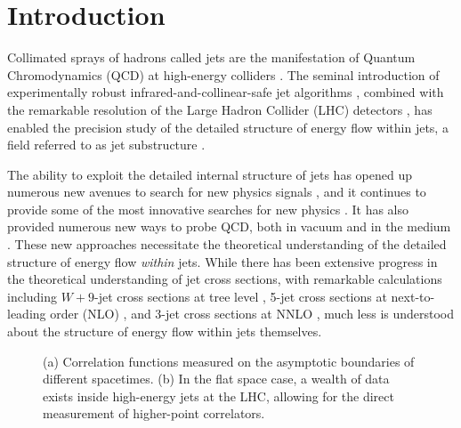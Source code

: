 \documentclass[letterpaper,11pt]{article}
\begin{document}
\section{Introduction}\label{sec:intro}


Collimated sprays of hadrons called jets are the manifestation of Quantum Chromodynamics (QCD) at high-energy colliders \cite{Hanson:1975fe,Sterman:1977wj}.
%
The seminal introduction of experimentally robust infrared-and-collinear-safe jet algorithms \cite{Cacciari:2005hq,Cacciari:2008gp,Cacciari:2011ma}, combined with the remarkable resolution of the Large Hadron Collider (LHC) detectors \cite{CMSPF,ATLAS:2017ghe}, has enabled the precision study of the detailed structure of energy flow within jets, a field referred to as jet substructure \cite{Larkoski:2017jix,Marzani:2019hun}. 
 

The ability to exploit the detailed internal structure of jets has opened up numerous new avenues to search for new physics signals \cite{Butterworth:2008iy,Kaplan:2008ie,Krohn:2009th}, and it continues to provide some of the most innovative searches for new physics \cite{CMS:2022jed,CMS:2021yqw}.
%
It has also provided numerous new ways to probe QCD, both in vacuum and in the medium \cite{Andrews:2018jcm,Cunqueiro:2021wls}.
%
These new approaches necessitate the theoretical understanding of the detailed structure of energy flow \emph{within} jets.
%
While there has been extensive progress in the theoretical understanding of jet cross sections, with remarkable calculations including $W+9$-jet cross sections at tree level \cite{Hoche:2019flt}, 5-jet cross sections at next-to-leading order (NLO) \cite{Badger:2013yda}, and 3-jet cross sections at NNLO \cite{Czakon:2021mjy}, much less is understood about the structure of energy flow within jets themselves.


\begin{figure}[t]
\begin{center}
\qquad\qquad
{}
\end{center}
\caption{
%
(a) Correlation functions measured on the asymptotic boundaries of different spacetimes.
%
(b) In the flat space case, a wealth of data exists inside high-energy jets at the LHC, allowing for the direct measurement of higher-point correlators.}
\label{fig:intro}
\end{figure}
\end{document}
